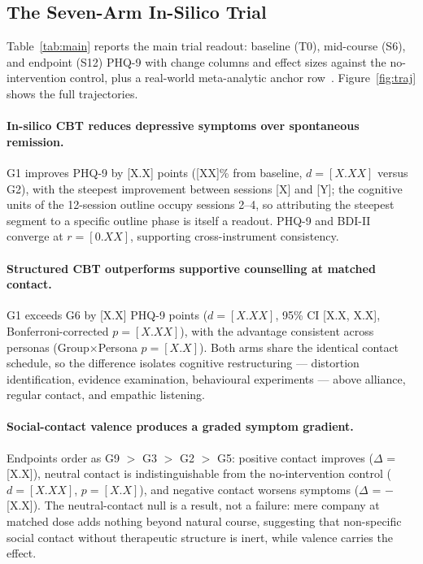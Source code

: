 \documentclass[10pt]{article}
\begin{document}
\subsection{The Seven-Arm In-Silico Trial}\label{sec:trial}

Table~\ref{tab:main} reports the main trial readout: baseline (T0), mid-course (S6), and endpoint (S12) PHQ-9 with change columns and effect sizes against the no-intervention control, plus a real-world meta-analytic anchor row~\citep{cuijpers2013}.
Figure~\ref{fig:traj} shows the full trajectories.

\paragraph{In-silico CBT reduces depressive symptoms over spontaneous remission.}
G1 improves PHQ-9 by [X.X] points ([XX]\% from baseline, $d = [X.XX]$ versus G2), with the steepest improvement between sessions [X] and [Y]; the cognitive units of the 12-session outline occupy sessions 2--4, so attributing the steepest segment to a specific outline phase is itself a readout.
PHQ-9 and BDI-II converge at $r = [0.XX]$, supporting cross-instrument consistency.

\paragraph{Structured CBT outperforms supportive counselling at matched contact.}
G1 exceeds G6 by [X.X] PHQ-9 points ($d = [X.XX]$, 95\% CI [X.X, X.X], Bonferroni-corrected $p = [X.XX]$), with the advantage consistent across personas (Group$\times$Persona $p = [X.X]$).
Both arms share the identical contact schedule, so the difference isolates cognitive restructuring --- distortion identification, evidence examination, behavioural experiments --- above alliance, regular contact, and empathic listening.

\paragraph{Social-contact valence produces a graded symptom gradient.}
Endpoints order as G9 $>$ G3 $>$ G2 $>$ G5: positive contact improves ($\Delta$ = [X.X]), neutral contact is indistinguishable from the no-intervention control ($d = [X.XX]$, $p = [X.X]$), and negative contact worsens symptoms ($\Delta$ = $-$[X.X]).
The neutral-contact null is a result, not a failure: mere company at matched dose adds nothing beyond natural course, suggesting that non-specific social contact without therapeutic structure is inert, while valence carries the effect.
\end{document}

